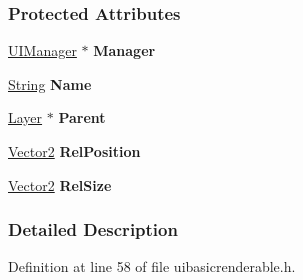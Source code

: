 \subsubsection*{Protected Attributes}
\begin{DoxyCompactItemize}
\item 
\hypertarget{classMezzanine_1_1UI_1_1BasicRenderable_ac5e51c5efe25911b3681deac71c970d0}{
\hyperlink{classMezzanine_1_1UIManager}{UIManager} $\ast$ {\bfseries Manager}}
\label{classMezzanine_1_1UI_1_1BasicRenderable_ac5e51c5efe25911b3681deac71c970d0}

\item 
\hypertarget{classMezzanine_1_1UI_1_1BasicRenderable_ae303a5be12bdaa01c8b27fb3993a17fa}{
\hyperlink{namespaceMezzanine_acf9fcc130e6ebf08e3d8491aebcf1c86}{String} {\bfseries Name}}
\label{classMezzanine_1_1UI_1_1BasicRenderable_ae303a5be12bdaa01c8b27fb3993a17fa}

\item 
\hypertarget{classMezzanine_1_1UI_1_1BasicRenderable_a11733fbad1348e5a0dbcd70c5532106d}{
\hyperlink{classMezzanine_1_1UI_1_1Layer}{Layer} $\ast$ {\bfseries Parent}}
\label{classMezzanine_1_1UI_1_1BasicRenderable_a11733fbad1348e5a0dbcd70c5532106d}

\item 
\hypertarget{classMezzanine_1_1UI_1_1BasicRenderable_affbc58e05c520c48a241083b2eb8dc24}{
\hyperlink{classMezzanine_1_1Vector2}{Vector2} {\bfseries RelPosition}}
\label{classMezzanine_1_1UI_1_1BasicRenderable_affbc58e05c520c48a241083b2eb8dc24}

\item 
\hypertarget{classMezzanine_1_1UI_1_1BasicRenderable_af901597b0e3e08a4b0280a212465efa2}{
\hyperlink{classMezzanine_1_1Vector2}{Vector2} {\bfseries RelSize}}
\label{classMezzanine_1_1UI_1_1BasicRenderable_af901597b0e3e08a4b0280a212465efa2}

\end{DoxyCompactItemize}


\subsubsection{Detailed Description}


Definition at line 58 of file uibasicrenderable.h.



